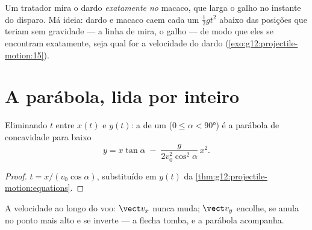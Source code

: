 \begin{remark}\label{rem:g12:projectile-motion:monkey}
Um tratador mira o dardo \emph{exatamente no} macaco, que larga o galho no instante do
disparo. Má ideia: dardo e macaco caem cada um $\tfrac12 gt^2$ abaixo das posições que
teriam sem gravidade --- a linha de mira, o galho --- de modo que eles se encontram
exatamente, seja qual for a velocidade do dardo
(\cref{exo:g12:projectile-motion:15}).
\end{remark}

\section{A parábola, lida por inteiro}

\begin{theorem}[Trajetória]\label{thm:g12:projectile-motion:trajectory}
Eliminando $t$ entre $x(t)$ e $y(t)$: a  de um 
($0 \leq \alpha < \ang{90}$) é a parábola de concavidade para baixo
\[
y = x\tan\alpha \;-\; \frac{g}{2 v_0^2 \cos^2\alpha}\, x^2 .
\]
\end{theorem}

\begin{proof}
$t = x/(v_0\cos\alpha)$, substituído em $y(t)$ da
\cref{thm:g12:projectile-motion:equations}.
\end{proof}

\begin{omfigure}

{\small A velocidade ao longo do voo: $\vect v_x$ nunca muda; $\vect v_y$ encolhe, se
anula no ponto mais alto e se inverte --- a flecha tomba, e a parábola acompanha.}
\end{omfigure}

